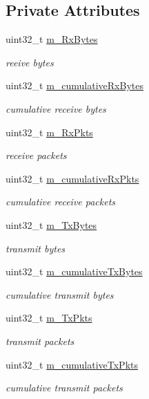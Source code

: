 \subsection*{Private Attributes}
\begin{DoxyCompactItemize}
\item 
uint32\+\_\+t \hyperlink{classRoutingStats_a13d3c32bff18dc6eeddf28641b8b43da}{m\+\_\+\+Rx\+Bytes}
\begin{DoxyCompactList}\small\item\em reeive bytes \end{DoxyCompactList}\item 
uint32\+\_\+t \hyperlink{classRoutingStats_a02a715726c3d89a0ff6693fe99b1d247}{m\+\_\+cumulative\+Rx\+Bytes}
\begin{DoxyCompactList}\small\item\em cumulative receive bytes \end{DoxyCompactList}\item 
uint32\+\_\+t \hyperlink{classRoutingStats_a794a76bc6ef6fa000c846c970909e441}{m\+\_\+\+Rx\+Pkts}
\begin{DoxyCompactList}\small\item\em receive packets \end{DoxyCompactList}\item 
uint32\+\_\+t \hyperlink{classRoutingStats_a484d7f31fc457f1e5cc3c593e1152798}{m\+\_\+cumulative\+Rx\+Pkts}
\begin{DoxyCompactList}\small\item\em cumulative receive packets \end{DoxyCompactList}\item 
uint32\+\_\+t \hyperlink{classRoutingStats_ae3df3a8c90e042d2a9e5a341b56b207a}{m\+\_\+\+Tx\+Bytes}
\begin{DoxyCompactList}\small\item\em transmit bytes \end{DoxyCompactList}\item 
uint32\+\_\+t \hyperlink{classRoutingStats_a9c4bbf90ae33d7d3ccf40a6834994636}{m\+\_\+cumulative\+Tx\+Bytes}
\begin{DoxyCompactList}\small\item\em cumulative transmit bytes \end{DoxyCompactList}\item 
uint32\+\_\+t \hyperlink{classRoutingStats_a34e64661d6d5886863226f0c0dd7d613}{m\+\_\+\+Tx\+Pkts}
\begin{DoxyCompactList}\small\item\em transmit packets \end{DoxyCompactList}\item 
uint32\+\_\+t \hyperlink{classRoutingStats_a2e7c09facbabbd2630873038db1d4be1}{m\+\_\+cumulative\+Tx\+Pkts}
\begin{DoxyCompactList}\small\item\em cumulative transmit packets \end{DoxyCompactList}\end{DoxyCompactItemize}



